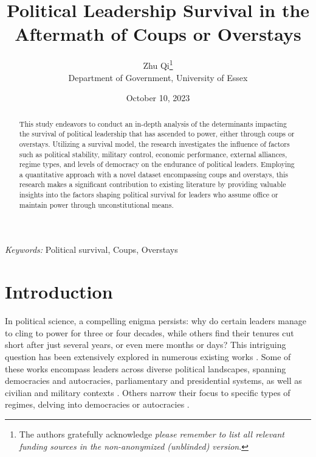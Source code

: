 \documentclass[
  a4paper,
  12pt]{article}
\begin{document}
\def\spacingset#1{\renewcommand{\baselinestretch}%
{#1}\small\normalsize} \spacingset{1}



\date{October 10, 2023}
\title{\bf Political Leadership Survival in the Aftermath of Coups or
Overstays}
\author{
Zhu Qi\thanks{The authors gratefully acknowledge \emph{please remember
to list all relevant funding sources in the non-anonymized (unblinded)
version}.}\\
Department of Government, University of Essex\\
}
\maketitle

\bigskip
\bigskip
\begin{abstract}
This study endeavors to conduct an in-depth analysis of the determinants
impacting the survival of political leadership that has ascended to
power, either through coups or overstays. Utilizing a survival model,
the research investigates the influence of factors such as political
stability, military control, economic performance, external alliances,
regime types, and levels of democracy on the endurance of political
leaders. Employing a quantitative approach with a novel dataset
encompassing coups and overstays, this research makes a significant
contribution to existing literature by providing valuable insights into
the factors shaping political survival for leaders who assume office or
maintain power through unconstitutional means.
\end{abstract}

\noindent%
{\it Keywords:} Political survival, Coups, Overstays
\vfill

\newpage
\spacingset{1.9} %
\section{Introduction}\label{introduction}

In political science, a compelling enigma persists: why do certain
leaders manage to cling to power for three or four decades, while others
find their tenures cut short after just several years, or even mere
months or days? This intriguing question has been extensively explored
in numerous existing works
\citep[\citet{buenodemesquita2003}]{clinton1975politics}. Some of these
works encompass leaders across diverse political landscapes, spanning
democracies and autocracies, parliamentary and presidential systems, as
well as civilian and military contexts \citep{buenodemesquita2003}.
Others narrow their focus to specific types of regimes, delving into
democracies \citep{svolik2014} or autocracies \citep{davenport2021}.
\end{document}
